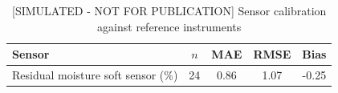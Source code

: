 \begin{table}[t]\centering\footnotesize
\caption{[SIMULATED - NOT FOR PUBLICATION] Sensor calibration against reference instruments}
\label{tab:fieldcal}
\begin{tabular}{p{}cccc}\toprule
Sensor & $n$ & MAE & RMSE & Bias\\\midrule
Residual moisture soft sensor (\%) & 24 & 0.86 & 1.07 & -0.25\\
\bottomrule\end{tabular}\end{table}
